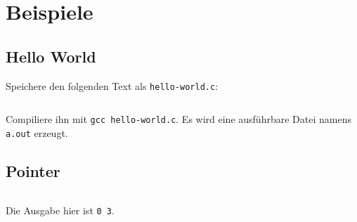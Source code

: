 \section{Beispiele}
\subsection{Hello World}
Speichere den folgenden Text als \texttt{hello-world.c}:

\inputminted[linenos, numbersep=5pt, tabsize=4, frame=lines, label=hello-world.c]{c}{scripts/c/hello-world.c}

Compiliere ihn mit \texttt{gcc hello-world.c}. Es wird eine ausführbare
Datei namens \texttt{a.out} erzeugt.

\subsection{Pointer}
\inputminted[linenos, numbersep=5pt, tabsize=4]{c}{scripts/c/pointer.c}

Die Ausgabe hier ist \texttt{0 3}.


